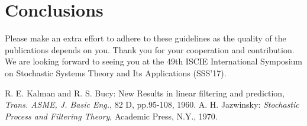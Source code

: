 \documentclass[a4paper]{article}
\begin{document}
\section{Conclusions}

Please make an extra effort to adhere to these guidelines as the quality
of the publications depends on you.
Thank you for your cooperation and contribution.
We are looking forward to seeing you at the 49th ISCIE International Symposium
on Stochastic Systems Theory and Its Applications (SSS'17).


\begin{thebibliography}{99}
R. E. Kalman and R. S. Bucy: 
New Results in linear filtering and prediction, 
{\it Trans. ASME, J. Basic Eng.}, 82 D, pp.95-108, 1960.
A. H. Jazwinsky: 
{\it Stochastic Process and Filtering Theory}, Academic Press, N.Y., 1970.
\end{thebibliography}
\end{document}
